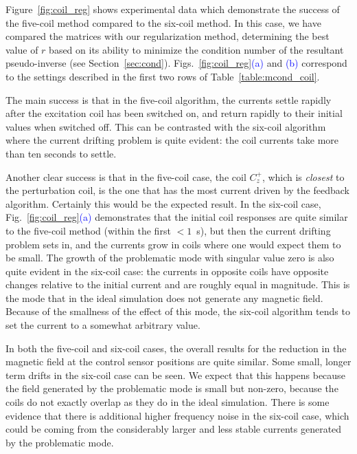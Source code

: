 Figure~\ref{fig:coil_reg} shows experimental data which demonstrate
the success of the five-coil method compared to the six-coil method.
In this case, we have compared the matrices with our regularization
method, determining the best value of $r$ based on its ability to
minimize the condition number of the resultant pseudo-inverse (see
Section~\ref{sec:cond}).
Figs.~\ref{fig:coil_reg}\textcolor{blue}{(a)}
and \textcolor{blue}{(b)} correspond to the settings described in the
first two rows of Table~\ref{table:mcond_coil}.

The main success is that in the five-coil algorithm, the currents
settle rapidly after the excitation coil has been switched on, and
return rapidly to their initial values when switched off.  This can be
contrasted with the six-coil algorithm where the current drifting
problem is quite evident: the coil currents take more than ten seconds
to settle.

Another clear success is that in the five-coil case, the coil $C_z^+$,
which is {\it closest} to the perturbation coil, is the one that has
the most current driven by the feedback algorithm.  Certainly this
would be the expected result.  In the six-coil case,
Fig.~\ref{fig:coil_reg}\textcolor{blue}{(a)} demonstrates that the initial coil
responses are quite similar to the five-coil method (within the first
$<1$~s), but then the current drifting problem sets in, and the
currents grow in coils where one would expect them to be small.  The
growth of the problematic mode with singular value zero is also quite
evident in the six-coil case: the currents in opposite coils have
opposite changes relative to the initial current and are roughly equal
in magnitude.  This is the mode that in the ideal simulation does not
generate any magnetic field.  Because of the smallness of the effect
of this mode, the six-coil algorithm tends to set the current to a
somewhat arbitrary value.

In both the five-coil and six-coil cases, the overall results for the
reduction in the magnetic field at the control sensor positions are
quite similar.  Some small, longer term drifts in the six-coil case
can be seen.  We expect that this happens because the field generated
by the problematic mode is small but non-zero, because the coils do
not exactly overlap as they do in the ideal simulation.  There is some
evidence that there is additional higher frequency noise in the
six-coil case, which could be coming from the considerably larger and
less stable currents generated by the problematic mode.

